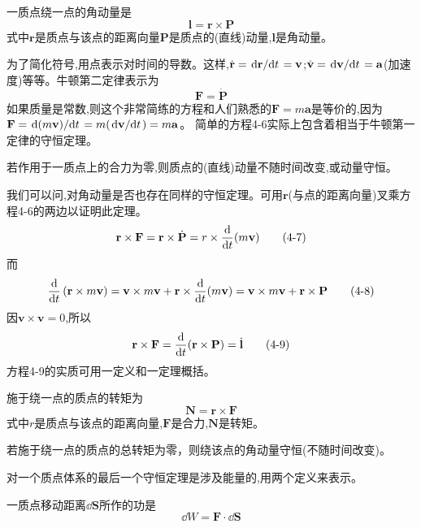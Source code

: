 \begin{definition}[角动量]
    一质点绕一点的角动量是
    \[\mathbf{l}=\mathbf{r} \times \mathbf{P} \tag{4-5}\]
    式中$\mathbf{r}$是质点与该点的距离向量$\mathbf{P}$是质点的(直线)动量,$\mathbf{l}$是角动量。
\end{definition}

为了简化符号,用点表示对时间的导数。这样,$\dot{\mathbf{r}}=\dv*{\mathbf{r}}{t}=\mathbf{v}$;$\dot{\mathbf{v}}=\dv*{\mathbf{v}}{t}=\mathbf{a}$(加速度)等等。牛顿第二定律表示为
\[\mathbf{F}=\dot{\mathbf{P}} \tag{4-6}\]
如果质量是常数,则这个非常简练的方程和人们熟悉的$\mathbf{F}=m\mathbf{a}$是等价的,因为$\mathbf{F}=\dv*{(m\mathbf{v})}{t}=m(\dv*{\mathbf{v}}{t})=m\mathbf{a}$。
简单的方程4-6实际上包含着相当于牛顿第一定律的守恒定理。

\begin{theorem}
    若作用于一质点上的合力为零,则质点的(直线)动量不随时间改变,或动量守恒。
\end{theorem}

我们可以问,对角动量是否也存在同样的守恒定理。可用$\mathbf{r}$(与点的距离向量)叉乘方程4-6的两边以证明此定理。
\[\mathbf{r} \times \mathbf{F}=\mathbf{r} \times \dot{\mathbf{P}}=r \times \dv{t}(m\mathbf{v}) \tag{4-7}\]
而
\[\dv{t}\left(\mathbf{r} \times m \mathbf{v}\right)=\mathbf{v} \times m \mathbf{v}+\mathbf{r} \times \dv{t}(m \mathbf{v})=\mathbf{v} \times m \mathbf{v}+\mathbf{r} \times \mathbf{P} \tag{4-8}\]
因$\mathbf{v} \times \mathbf{v}=0$,所以
\[\mathbf{r} \times \mathbf{F}=\dv{t}(\mathbf{r} \times \mathbf{P})=\dot{\mathbf{l}} \tag{4-9}\]
方程4-9的实质可用一定义和一定理概括。

\begin{definition}[转矩]
    施于绕一点的质点的转矩为
    \[\mathbf{N}=\mathbf{r} \times \mathbf{F} \tag{4-10}\]
    式中$r$是质点与该点的距离向量,$\mathbf{F}$是合力,$\mathbf{N}$是转矩。 
\end{definition}

\begin{theorem}
    若施于绕一点的质点的总转矩为零，则绕该点的角动量守恒(不随时间改变)。
\end{theorem}

对一个质点体系的最后一个守恒定理是涉及能量的,用两个定义来表示。

\begin{definition}[功]
    一质点移动距离$\dd{\mathbf{S}}$所作的功是
    \[\dd{W}=\mathbf{F} \cdot \dd{\mathbf{S}} \tag{4-11}\]
\end{definition}

